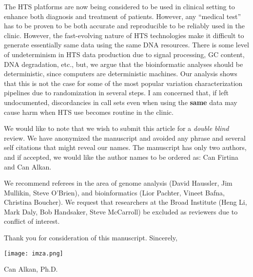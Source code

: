 \documentclass[10pt]{article}
\begin{document}
The HTS platforms are now being considered to be used in clinical setting to enhance both diagnosis and treatment of patients. However, any ``medical test''
has to be proven to be both accurate and reproducible  to be reliably used in the clinic. However, the fast-evolving nature of HTS technologies make it difficult
to generate essentially same data using the same DNA resources. There is some level of undeterminism in HTS data production due to signal processing, GC content, DNA degradation, etc., but, 
we argue that the bioinformatic analyses should be deterministic, since computers are deterministic machines. Our analysis shows that this is not the case for some of the most popular variation characterization pipelines due to randomization in several steps. I am concerned that, if left undocumented, discordancies in call sets even when using the {\bf same} data
 may cause harm when HTS use becomes routine in the clinic.

We would like to note that we wish to submit this article for a {\it double blind} review. We have anonymized the manuscript and avoided any phrase and several self citations
 that might reveal our names. The manuscript has only two authors, and if accepted, we would like the author names to be ordered as: Can Firtina and Can Alkan.

We recommend referees in the area of genome analysis (David Haussler, Jim Mullikin, Steve O'Brien), and
bioinformatics (Lior Pachter, Vineet Bafna, Christina Boucher).
We request that researchers at the Broad Institute (Heng Li, Mark Daly, Bob Handsaker, Steve McCarroll) be excluded as reviewers due to conflict of interest.

Thank you for consideration of this manuscript.
Sincerely,


\vspace*{0.5cm}

\noindent\texttt{[image: imza.png]} 

\vspace*{0.5cm}
\noindent Can Alkan, Ph.D. \\

\end{document}
